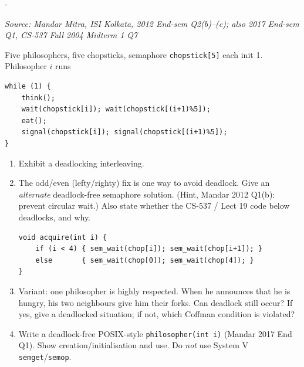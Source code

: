 \documentclass[11pt,a4paper]{article}
\makeatletter
\newcommand{\keepspace}[1]{\par\penalty-100\begingroup
  \setlength{\dimen@}{#1}\dimen@ii\pagegoal\advance\dimen@ii-\pagetotal
  \ifdim\dimen@>\dimen@ii\ifdim\dimen@ii>\z@\vfil\fi\break\fi\endgroup}
\newcounter{qn}[section]
\newenvironment{Qn}[4]{%
  \refstepcounter{qn}\keepspace{7\baselineskip}%
  \begin{tcolorbox}[qboxstyle, title={Q\thesection.\theqn\ \ [#1 \textbar\ #2]\ \ #4}]%
  {\footnotesize\color{g3}\textit{Source: #3}}\par\smallskip%
}{%
  \end{tcolorbox}%
}
\makeatother
\begin{document}
\begin{Qn}{Hard}{Lect 19}{Mandar Mitra, ISI Kolkata, 2012 End-sem Q2(b)--(c); also 2017 End-sem Q1, CS-537 Fall 2004 Midterm 1 Q7}{Dining philosophers: deadlock, asymmetry, footman, respected guest}
Five philosophers, five chopsticks, semaphore \texttt{chopstick[5]} each
init 1. Philosopher $i$ runs
\begin{lstlisting}[numbers=none]
while (1) {
    think();
    wait(chopstick[i]); wait(chopstick[(i+1)%5]);
    eat();
    signal(chopstick[i]); signal(chopstick[(i+1)%5]);
}
\end{lstlisting}

\begin{enumerate}
  \item[(a)] Exhibit a deadlocking interleaving.
  \item[(b)] The odd/even (lefty/righty) fix is one way to avoid deadlock.
        Give an \emph{alternate} deadlock-free semaphore solution. (Hint,
        Mandar 2012 Q1(b): prevent circular wait.) Also state whether the
        CS-537 / Lect 19 code below deadlocks, and why.
\begin{lstlisting}[numbers=none]
void acquire(int i) {
    if (i < 4) { sem_wait(chop[i]); sem_wait(chop[i+1]); }
    else       { sem_wait(chop[0]); sem_wait(chop[4]); }
}
\end{lstlisting}
  \item[(c)] Variant: one philosopher is highly respected. When he
        announces that he is hungry, his two neighbours give him their
        forks. Can deadlock still occur? If yes, give a deadlocked
        situation; if not, which Coffman condition is violated?
  \item[(d)] Write a deadlock-free POSIX-style \texttt{philosopher(int i)}
        (Mandar 2017 End Q1). Show creation/initialisation and use. Do
        \emph{not} use System V \texttt{semget}/\texttt{semop}.
\end{enumerate}
\end{Qn}
\end{document}
